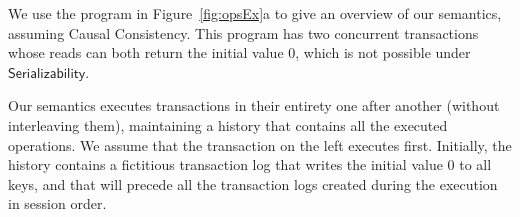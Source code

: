 %

We use the program in Figure~\ref{fig:opsEx}a to give an overview of our semantics, assuming Causal Consistency. This program has two concurrent transactions whose reads can both return the initial value $0$, which is not possible under $\mathsf{Serializability}$. 

Our semantics executes transactions in their entirety one after another (without interleaving them), maintaining a history that contains all the executed operations. We assume that the transaction on the left executes first. Initially, the history contains a fictitious transaction log that writes the initial value 0 to all keys, and that will precede all the transaction logs created during the execution in session order. 

